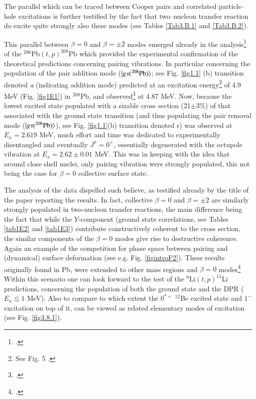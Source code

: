 \begin{subappendices}
 The parallel which can be traced between Cooper pairs and correlated particle--hole excitations is further testified by the fact that two--nucleon transfer reaction do excite quite strongly also these modes (see Tables \ref{Tab3.B.1} and \ref{Tab3.B.2}). 

This parallel between $\beta=0$ and $\beta=\pm2$ modes emerged already in the analysis\footnote{\cite{Broglia:67}.} of the $^{206}$Pb$(t,p)^{208}$Pb which provided the experimental confirmation of the theoretical predictions concerning pairing vibrations. In particular concerning the population of the pair addition mode ($|{gs(^{208}\text{Pb})} \rangle$; see Fig. \ref{fig1.1} (b) transition denoted \emph{a} (indicating addition mode)  predicted at an excitation energy\footnote{See Fig. 5 \cite{Bes:66}.} of 4.9 MeV (Fig. \ref{fig1E1}) in $^{208}$Pb, and observed\footnote{\cite{Bjerregaard:66b}.} at 4.87 MeV. Now, because the lowest excited state populated with a sizable cross section (21$\pm3\%$) of that associated with the ground state transition (and thus populating the pair removal mode ($|{gs(^{206}\text{Pb})} \rangle$), see Fig. \ref{fig1.1}(b) transition denoted r) was observed at $E_x=2.619$ MeV, much effort and time was dedicated to experimentally disentangled and eventually $J^\pi=0^+$, essentially degenerated with the octupole vibration at $E_x=2.62\pm0.01$ MeV.  This was in keeping with the idea that around close shell nuclei, only pairing vibration were strongly populated, this not being the case for $\beta=0$ collective surface state. 

The analysis of the data dispelled such believe, as testified already by the title of the paper reporting the results. In fact, collective $\beta=0$ and $\beta=\pm2$ are similarly strongly populated in two-nucleon transfer reactions, the main difference being the fact that while the $Y$-component (ground state correlations, see Tables \ref{tab1E2} and \ref{tab1E3}) contribute constructively coherent to the cross section, the similar components of the $\beta=0$ modes give rise to destructive coherence. Again an example of the competition for phase space between pairing and (dynamical) surface deformation (see e.g. Fig. \ref{figintroF2}). These results originally found in Pb, were extended to other mass regions and $\beta=0$ modes\footnote{\cite{Broglia:71}.} Within this scenario one can look forward to the test of the $^9$Li$(t,p)^{11}$Li predictions, concerning the population of both the ground state and the DPR ($E_x\lesssim1$ MeV). Also to compare to which extent the $0^{*+}$ $^{12}$Be excited state and $1^-$ excitation on top of it, can be viewed as related elementary modes of excitation (see Fig. \ref{fig3.8.1}).

\end{subappendices}
